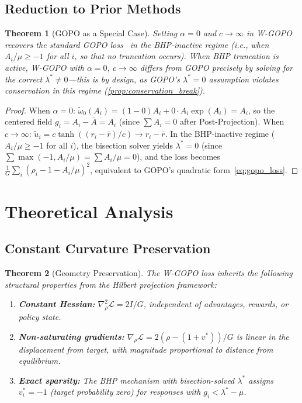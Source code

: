 \documentclass[11pt]{article}
\newtheorem{theorem}{Theorem}[section]
\theoremstyle{definition}
\theoremstyle{remark}
\newcommand{\loss}{\mathcal{L}}
\begin{document}
\subsection{Reduction to Prior Methods}

\begin{theorem}[GOPO as a Special Case]
\label{thm:reduction}
Setting $\alpha = 0$ and $c \to \infty$ in W-GOPO recovers the standard GOPO loss~\cite{Wang2025GOPO} in the BHP-inactive regime (i.e., when $A_i/\mu \geq -1$ for all $i$, so that no truncation occurs). When BHP truncation is active, W-GOPO with $\alpha = 0$, $c \to \infty$ differs from GOPO precisely by solving for the correct $\lambda^* \neq 0$---this is by design, as GOPO's $\lambda^* = 0$ assumption violates conservation in this regime (\cref{prop:conservation_break}).
\end{theorem}

\begin{proof}
When $\alpha = 0$: $\tilde{\omega}_0(A_i) = (1-0)A_i + 0 \cdot A_i\exp(A_i) = A_i$, so the centered field $g_i = A_i - \bar{A} = A_i$ (since $\sum A_i = 0$ after Post-Projection). When $c \to \infty$: $\tilde{u}_i = c\tanh((r_i - \bar{r})/c) \to r_i - \bar{r}$. In the BHP-inactive regime ($A_i/\mu \geq -1$ for all $i$), the bisection solver yields $\lambda^* = 0$ (since $\sum \max(-1, A_i/\mu) = \sum A_i/\mu = 0$), and the loss becomes $\frac{1}{G}\sum_i (\rho_i - 1 - A_i/\mu)^2$, equivalent to GOPO's quadratic form~\eqref{eq:gopo_loss}.
\end{proof}

\section{Theoretical Analysis}
\label{sec:analysis}

\subsection{Constant Curvature Preservation}

\begin{theorem}[Geometry Preservation]
\label{thm:geometry}
The W-GOPO loss inherits the following structural properties from the Hilbert projection framework:
\begin{enumerate}[leftmargin=2em]
    \item \textbf{Constant Hessian:} $\nabla^2_\rho \loss = 2I/G$, independent of advantages, rewards, or policy state.
    \item \textbf{Non-saturating gradients:} $\nabla_\rho \loss = 2(\rho - (1+v^*))/G$ is linear in the displacement from target, with magnitude proportional to distance from equilibrium.
    \item \textbf{Exact sparsity:} The BHP mechanism with bisection-solved $\lambda^*$ assigns $v_i^* = -1$ (target probability zero) for responses with $g_i < \lambda^* - \mu$.
\end{enumerate}
\end{theorem}
\end{document}
